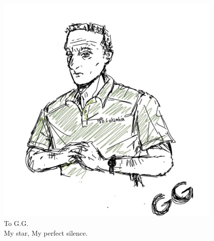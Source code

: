 \documentclass[11pt]{article}
\begin{document}
    \maketitle
    
    \begin{figure}[h!]
        \centering
        \includegraphics[width=0.5\linewidth]{img/Gigi}
        \caption*{{\setmainfont{Handodle} To G.G. \\ My star, My perfect silence.}}
    \end{figure}
    
	\tableofcontents
	\newpage	
	
	

	

	

	
	
     
    
	
    
    
\end{document}
